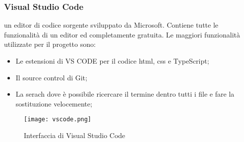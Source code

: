 \subsubsection{Visual Studio Code}
un editor di codice sorgente sviluppato da Microsoft. Contiene tutte le funzionalità di un editor ed completamente gratuita. Le maggiori funzionalità utilizzate per il progetto sono:
\begin{itemize}
    \item Le estensioni di VS CODE per il codice html, css e TypeScript;
    \item Il source control di Git;
    \item La serach dove è possibile ricercare il termine dentro tutti i file e fare la sostituzione velocemente;
\end{itemize}
\begin{figure}[H]
    \centering
    \texttt{[image: vscode.png]}
    \caption{Interfaccia di Visual Studio Code}
\end{figure}
    
